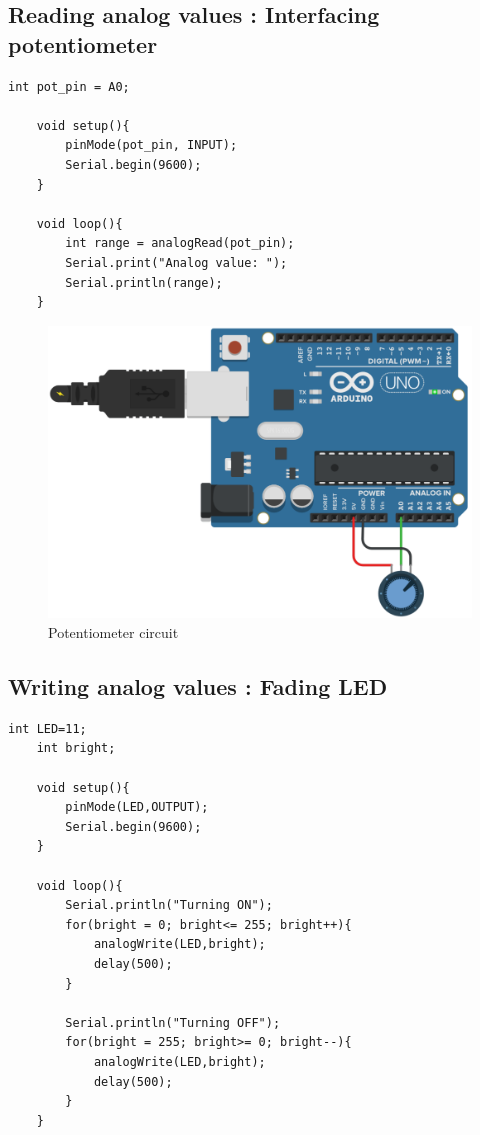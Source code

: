     \newpage
    \subsection{Reading analog values : Interfacing potentiometer}
    \begin{lstlisting}[style=CStyle]
    int pot_pin = A0;
    
    void setup(){
        pinMode(pot_pin, INPUT);
        Serial.begin(9600);
    }
    
    void loop(){
        int range = analogRead(pot_pin);
        Serial.print("Analog value: ");
        Serial.println(range);
    }
    \end{lstlisting}
    
    \begin{figure}
        \centering
        \includegraphics{Images/Programing_Arduino/potentio_ckt.png}
        \caption{Potentiometer circuit}
    \end{figure}

    \newpage
    \subsection{Writing analog values : Fading LED}
    \begin{lstlisting}[style=CStyle]
    int LED=11;
    int bright;
    
    void setup(){
        pinMode(LED,OUTPUT);		
        Serial.begin(9600);
    }
    
    void loop(){
        Serial.println("Turning ON");
        for(bright = 0; bright<= 255; bright++){
            analogWrite(LED,bright);
            delay(500);
        }
        
        Serial.println("Turning OFF");
        for(bright = 255; bright>= 0; bright--){
            analogWrite(LED,bright);
            delay(500);
        }
    }
    \end{lstlisting}

